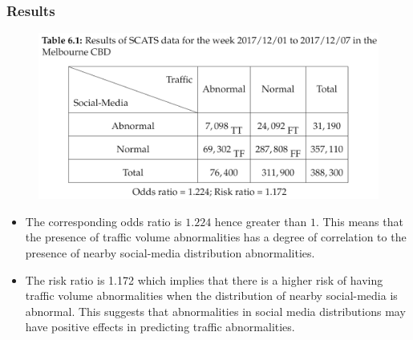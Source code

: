 \begin{frame}
    \frametitle{Results}
    \begin{figure}
        \centering
        \includegraphics[width=0.7\columnwidth]{resource/figures/odds_ratio.png}
    \end{figure}
    \vspace{-0.2cm}
    \begin{itemize} \tiny
        \item The corresponding odds ratio is $1.224$ hence greater than $1$. This means that the presence of traffic volume abnormalities has a degree of correlation to the presence of nearby social-media distribution abnormalities.
        \item The risk ratio is 1.172 which implies that there is a higher risk of having traffic volume abnormalities when the distribution of nearby social-media is abnormal. This suggests that abnormalities in social media distributions may have positive effects in predicting traffic abnormalities.
    \end{itemize}
\end{frame}

